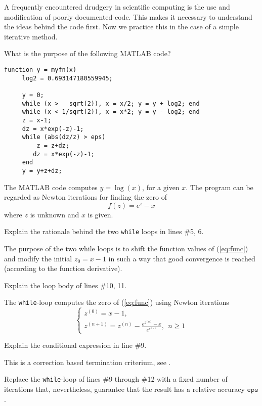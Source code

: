 
\begin{problem}
  A frequently encountered drudgery in scientific computing is
  the use and modification of poorly documented code. This makes
  it necessary to understand the ideas behind the code first. 
  Now we practice this in the case of a simple iterative method. 

  \begin{subproblem}[4]
    What is the purpose of the following MATLAB code?
    \begin{lstlisting}[style=mcode]
     function y = myfn(x)
     log2 = 0.693147180559945;
     
     y = 0;
     while (x >   sqrt(2)), x = x/2; y = y + log2; end
     while (x < 1/sqrt(2)), x = x*2; y = y - log2; end
     z = x-1;
     dz = x*exp(-z)-1;
     while (abs(dz/z) > eps)
         z = z+dz;
        dz = x*exp(-z)-1;
     end
     y = y+z+dz;
\end{lstlisting}
\end{subproblem}
\begin{solution}
 The MATLAB code computes $y=\log{(x)}$, for a given $x$.
    The program can be regarded as Newton iterations for finding the zero of
    \begin{equation}\label{eq:func} f(z)=e^{z}-x\end{equation}
    where $z$ is unknown and $x$ is given.
\end{solution}

\begin{subproblem}[3]
  Explain the rationale behind the two \texttt{while} loops in
  lines \#5, 6.
  \begin{solution}
 The purpose of the two while loops is to shift the function values of (\ref{eq:func}) and
        modify the initial $z_0=x-1$ in such a way that good convergence is reached (according to the function derivative).
\end{solution}
\end{subproblem}
\begin{subproblem}[2]
  Explain the loop body of lines \#10, 11.
  \begin{solution}
The \texttt{while}-loop computes the zero of (\ref{eq:func}) using Newton iterations
  $$\left\{\begin{array}{lcc}z^{(0)}=x-1, \\
      z^{(n+1)}= z^{(n)}-\frac{e^{z^{(n)}}-x}{e^{z^{(n)}}},~~n\geq 1   \end{array}\right.
  $$
\end{solution}
\end{subproblem}
\begin{subproblem}[2]
  Explain the conditional expression in line \#9. 
  \begin{solution}
This is a correction based termination criterium, see .
\end{solution}
\end{subproblem}
\begin{subproblem}[4]
  Replace the \texttt{while}-loop of lines \#9 through \#12 with a fixed number of iterations that,
  nevertheless, guarantee that the result has a relative accuracy $\mathtt{eps}$.
  

\end{subproblem}
\end{problem}
